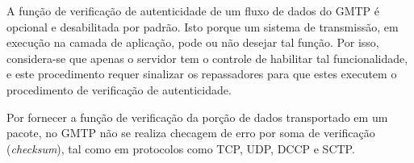 A função de verificação de autenticidade de um fluxo de dados do GMTP é opcional e desabilitada por padrão. Isto porque um sistema de transmissão, em execução na camada de aplicação, pode ou não desejar tal função. Por isso, considera-se que apenas o servidor tem o controle de habilitar tal funcionalidade, e este procedimento requer sinalizar os repassadores para que estes executem o procedimento de verificação de autenticidade.

Por fornecer a função de verificação da porção de dados transportado em um pacote, no GMTP não se realiza
checagem de erro por soma de verificação (\textit{checksum}), tal como em protocolos como TCP, UDP, DCCP e SCTP.

